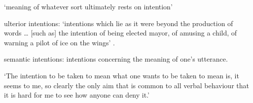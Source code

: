 \documentclass[12pt]{extarticle}
\begin{document}
\begin{multicols}{3}
‘meaning of whatever sort ultimately rests on intention’
\citep[p.\ 298]{Davidson:1992pl}
 
ulterior intentions: ‘intentions which lie as it were beyond the production of words … [such as] the intention of being elected mayor, of amusing a child, of warning a pilot of ice on the wings’ \citep[p.\ 298]{Davidson:1992pl}.
 
semantic intentions: intentions concerning the meaning of one’s utterance.
 
‘The intention to be taken to mean what one wants to be taken to mean is, it seems to me, so clearly the only aim that is common to all verbal behaviour that it is hard for me to see how anyone can deny it.’
\citep[p.\ 11]{Davidson:1994ol}
 
 
 
 
\footnotesize 


\end{multicols}
\end{document}
